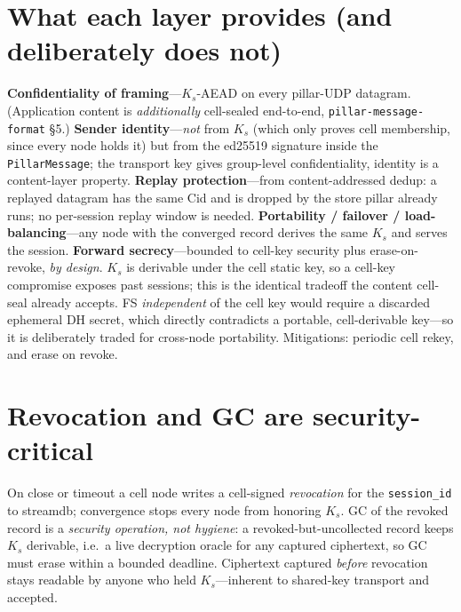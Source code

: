\documentclass[10pt,twocolumn]{article}
\newcommand{\code}[1]{\texttt{\small #1}}
\newcommand{\Ks}{\ensuremath{K_s}}
\begin{document}
\section{What each layer provides (and deliberately does not)}
\textbf{Confidentiality of framing}---\Ks{}-AEAD on every pillar-UDP datagram.
(Application content is \emph{additionally} cell-sealed end-to-end,
\code{pillar-message-format} \S5.) \textbf{Sender identity}---\emph{not} from \Ks{}
(which only proves cell membership, since every node holds it) but from the
ed25519 signature inside the \code{PillarMessage}; the transport key gives
group-level confidentiality, identity is a content-layer property.
\textbf{Replay protection}---from content-addressed dedup: a replayed datagram has
the same Cid and is dropped by the store pillar already runs; no per-session replay
window is needed. \textbf{Portability / failover / load-balancing}---any node with
the converged record derives the same \Ks{} and serves the session.
\textbf{Forward secrecy}---bounded to cell-key security plus erase-on-revoke,
\emph{by design}. \Ks{} is derivable under the cell static key, so a cell-key
compromise exposes past sessions; this is the identical tradeoff the content
cell-seal already accepts. FS \emph{independent} of the cell key would require a
discarded ephemeral DH secret, which directly contradicts a portable,
cell-derivable key---so it is deliberately traded for cross-node portability.
Mitigations: periodic cell rekey, and erase on revoke.

\section{Revocation and GC are security-critical}
On close or timeout a cell node writes a cell-signed \emph{revocation} for the
\code{session\_id} to streamdb; convergence stops every node from honoring \Ks{}.
GC of the revoked record is a \emph{security operation, not hygiene}: a
revoked-but-uncollected record keeps \Ks{} derivable, i.e.\ a live decryption
oracle for any captured ciphertext, so GC must erase within a bounded deadline.
Ciphertext captured \emph{before} revocation stays readable by anyone who held
\Ks{}---inherent to shared-key transport and accepted.
\end{document}
